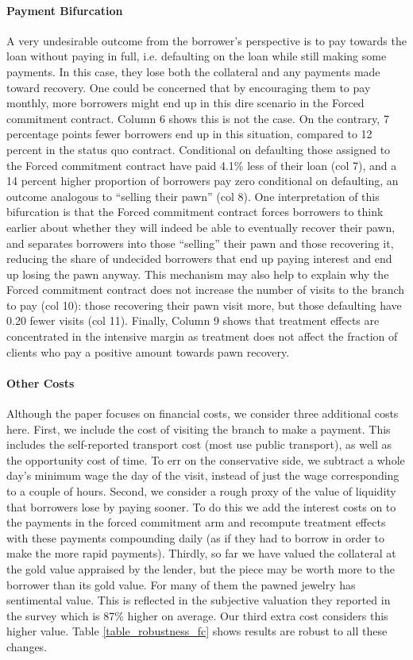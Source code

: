 \documentclass[12pt, a4paper]{article}
\begin{document}
\paragraph*{Payment Bifurcation} A very undesirable outcome from the borrower's perspective is to pay towards the loan without paying in full, i.e. defaulting on the loan while still making some payments. In this case, they lose both the collateral and any payments made toward recovery. One could be concerned that by encouraging them to pay monthly, more borrowers might end up in this dire scenario in the Forced commitment contract. Column 6 shows this is not the case. On the contrary, 7 percentage points fewer borrowers end up in this situation, compared to 12 percent in the status quo contract. Conditional on defaulting those assigned to the Forced commitment contract have paid 4.1\% less of their loan (col 7), and a 14 percent higher proportion of borrowers pay zero conditional on defaulting, an outcome analogous to
``selling their pawn'' (col 8). One interpretation of this bifurcation is that the Forced commitment contract forces borrowers to think earlier about whether they will indeed be able to eventually recover their pawn, and separates borrowers into those ``selling'' their pawn and those recovering it, reducing the share of undecided borrowers that end up paying interest and end up losing the pawn anyway. This mechanism may also help to explain why the Forced commitment contract does not increase the number of visits to the branch to pay (col 10): those recovering their pawn visit more, but those defaulting have 0.20 fewer visits (col 11). Finally, Column 9 shows that treatment effects are concentrated in the intensive margin as treatment does not affect the fraction of clients who pay a positive amount towards pawn recovery.



\paragraph*{Other Costs} Although the paper focuses on financial costs, we consider three additional costs here. First, we include the cost of visiting the branch to make a payment. This includes the self-reported transport cost (most use public transport), as well as the opportunity cost of time. To err on the conservative side, we subtract a whole day's minimum wage the day of the visit, instead of just the wage corresponding to a couple of hours. Second, we consider a rough proxy of the value of liquidity that borrowers lose by paying sooner. To do this we add the interest costs on to the payments in the forced commitment arm and recompute treatment effects with these payments compounding daily (as if they had to borrow in order to make the more rapid payments). Thirdly, so far we have valued the collateral at the gold value appraised by the lender, but the piece may be worth more to the borrower than its gold value.  For many of them the pawned jewelry has sentimental value. This is reflected in the subjective valuation they reported in the survey which is 87\% higher on average. Our third extra cost considers this higher value. Table \ref{table_robustness_fc} shows results are robust to all these changes. 
\end{document}
